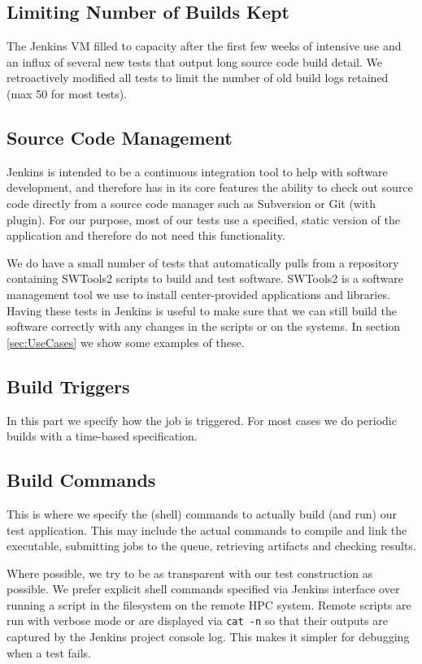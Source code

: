 \documentclass[AMA]{WileyNJD-v1}
\begin{document}
\subsection{Limiting Number of Builds Kept}
The Jenkins VM filled to capacity after the first few weeks of intensive use and an influx of several new tests that output long source code build detail.
We retroactively modified all tests to limit the number of old build logs retained (max 50 for most tests). 

\subsection{Source Code Management}
Jenkins is intended to be a continuous integration tool to help with software development, and therefore has in its core features the ability to check out source code directly from a source code manager such as Subversion or Git (with plugin).
For our purpose, most of our tests use a specified, static version of the application and therefore do not need this functionality. 

We do have a small number of tests that automatically pulls from a repository containing SWTools2 scripts to build and test software. 
SWTools2 is a software management tool we use to install center-provided applications and libraries. Having these tests in Jenkins is useful to make sure that we can still build the software correctly with any changes in the scripts or on the systems. 
In section \ref{sec:UseCases} we show some examples of these.

\subsection{Build Triggers}
In this part we specify how the job is triggered. 
For most cases we do periodic builds with a time-based specification.

\subsection{Build Commands}
This is where we specify the (shell) commands to actually build (and run) our test application. 
This may include the actual commands to compile and link the executable, submitting jobs to the queue, retrieving artifacts and checking results.

Where possible, we try to be as transparent with our test construction as possible. 
We prefer explicit shell commands specified via Jenkins interface over running a script in the filesystem on the remote HPC system. 
Remote scripts are run with verbose mode or are displayed via \texttt{cat -n} so that their outputs are captured by the Jenkins project console log. 
This makes it simpler for debugging when a test fails.
\end{document}

